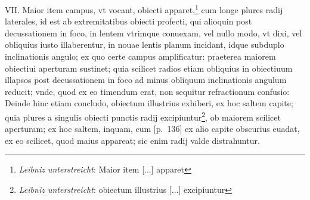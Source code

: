 \pend \pstart [p.~135] VII. Maior item campus, vt vocant, obiecti apparet,\footnote{\textit{Leibniz unterstreicht}: Maior item [...] apparet} cum longe plures radij laterales, id est ab extremitatibus obiecti profecti, qui alioquin post decussationem  in foco\protect{}, in lentem\protect{} vtrimque conuexam, vel nullo modo,  vt dixi, vel obliquius iusto illaberentur, in nouae lentis\protect{} planum incidant, idque subduplo inclinationis\protect{} angulo; ex quo certe campus amplificatur: praeterea maiorem obiectiui\protect{} aperturam sustinet; quia scilicet radios\protect{}  etiam obliquius in obiectiuum\protect{} illapsos post decussationem in foco\protect{} ad minus obliquum inclinationis angulum\protect{}  reducit; vnde, quod ex eo timendum erat, non sequitur refractionum\protect{} confusio: Deinde hinc etiam concludo,  obiectum illustrius exhiberi, ex hoc saltem capite; quia  plures a singulis obiecti punctis radij excipiuntur\footnote{\textit{Leibniz unterstreicht}: obiectum illustrius [...] excipiuntur}, ob  maiorem scilicet aperturam; ex hoc saltem, inquam, cum  [p.~136] ex alio capite obscurius euadat, ex eo scilicet, quod  maius appareat; sic enim radij valde distrahuntur.